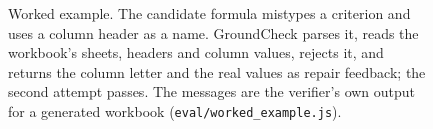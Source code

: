 \begin{figure}[!t]
{}
\caption{Worked example. The candidate formula mistypes a criterion and uses a column header as a name. GroundCheck parses it, reads the workbook's sheets, headers and column values, rejects it, and returns the column letter and the real values as repair feedback; the second attempt passes. The messages are the verifier's own output for a generated workbook (\texttt{eval/worked\_example.js}).}
\label{fig:anatomy}
\end{figure}

